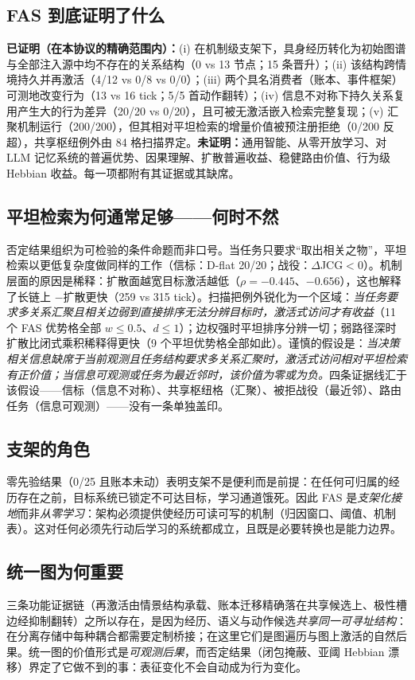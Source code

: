\documentclass[10pt,a4paper]{ctexart}
\begin{document}
\subsection{FAS 到底证明了什么}
\textbf{已证明（在本协议的精确范围内）：}(i) 在机制级支架下，具身经历转化为初始图谱与全部注入源中均不存在的关系结构（0 vs 13 节点；15 条晋升）；(ii) 该结构跨情境持久并再激活（4/12 vs 0/8 vs 0/0）；(iii) 两个具名消费者（账本、事件框架）可测地改变行为（13 vs 16 tick；5/5 首动作翻转）；(iv) 信息不对称下持久关系复用产生大的行为差异（20/20 vs 0/20），且可被无激活嵌入检索完整复现；(v) 汇聚机制运行（200/200），但其相对平坦检索的增量价值被预注册拒绝（0/200 反超），共享枢纽例外由 84 格扫描界定。\textbf{未证明：}通用智能、从零开放学习、对 LLM 记忆系统的普遍优势、因果理解、扩散普遍收益、稳健路由价值、行为级 Hebbian 收益。每一项都附有其证据或其缺席。

\subsection{平坦检索为何通常足够——何时不然}
否定结果组织为可检验的条件命题而非口号。当任务只要求“取出相关之物”，平坦检索以更低复杂度做同样的工作（信标：D-flat 20/20；战役：$\Delta$JCG${<}0$）。机制层面的原因是稀释：扩散面越宽目标激活越低（$\rho{=}{-}0.445$、${-}0.656$），这也解释了长链上 $-$扩散更快（259 vs 315 tick）。扫描把例外锐化为一个区域：\emph{当任务要求多关系汇聚且相关边弱到直接排序无法分辨目标时，激活式访问才有收益}（11 个 FAS 优势格全部 $w{\le}0.5$、$d{\le}1$）；边权强时平坦排序分辨一切；弱路径深时扩散比闭式乘积稀释得更快（9 个平坦优势格全部如此）。谨慎的假设是：\emph{当决策相关信息缺席于当前观测且任务结构要求多关系汇聚时，激活式访问相对平坦检索有正价值；当信息可观测或任务为最近邻时，该价值为零或为负。}四条证据线汇于该假设——信标（信息不对称）、共享枢纽格（汇聚）、被拒战役（最近邻）、路由任务（信息可观测）——没有一条单独盖印。

\subsection{支架的角色}
零先验结果（0/25 且账本未动）表明支架不是便利而是前提：在任何可归属的经历存在之前，目标系统已锁定不可达目标，学习通道饿死。因此 FAS 是\emph{支架化接地}而非\emph{从零学习}：架构必须提供使经历可读可写的机制（归因窗口、阈值、机制表）。这对任何必须先行动后学习的系统都成立，且既是必要转换也是能力边界。

\subsection{统一图为何重要}
三条功能证据链（再激活由情景结构承载、账本迁移精确落在共享候选上、极性槽边经抑制翻转）之所以存在，是因为经历、语义与动作候选\emph{共享同一可寻址结构}：在分离存储中每种耦合都需要定制桥接；在这里它们是图遍历与图上激活的自然后果。统一图的价值形式是\emph{可观测后果}，而否定结果（闭包掩蔽、亚阈 Hebbian 漂移）界定了它做不到的事：表征变化不会自动成为行为变化。
\end{document}
